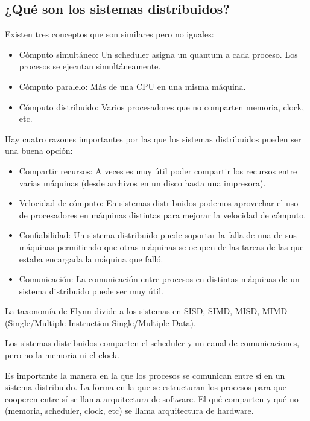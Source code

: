 \documentclass{article}
\begin{document}
\subsection{¿Qu\'e son los sistemas distribuidos?}

Existen tres conceptos que son similares pero no iguales:

\begin{itemize}
\item C\'omputo simult\'aneo: Un scheduler asigna un quantum a cada proceso. Los procesos se ejecutan simult\'aneamente.
\item C\'omputo paralelo: M\'as de una CPU en una misma m\'aquina.
\item C\'omputo distribuido: Varios procesadores que no comparten memoria, clock, etc.
\end{itemize}

Hay cuatro razones importantes por las que los sistemas distribuidos pueden ser una buena opci\'on:

\begin{itemize}
\item Compartir recursos: A veces es muy \'util poder compartir los recursos entre varias m\'aquinas (desde archivos en un disco hasta una impresora).
\item Velocidad de c\'omputo: En sistemas distribuidos podemos aprovechar el uso de procesadores en m\'aquinas distintas para mejorar la velocidad de c\'omputo.
\item Confiabilidad: Un sistema distribuido puede soportar la falla de una de sus m\'aquinas permitiendo que otras m\'aquinas se ocupen de las tareas de las que estaba encargada la m\'aquina que fall\'o.
\item Comunicaci\'on: La comunicaci\'on entre procesos en distintas m\'aquinas de un sistema distribuido puede ser muy \'util.
\end{itemize}

La taxonom\'ia de Flynn divide a los sistemas en SISD, SIMD, MISD, MIMD (Single/Multiple Instruction Single/Multiple Data).

Los sistemas distribuidos comparten el scheduler y un canal de comunicaciones, pero no la memoria ni el clock.

Es importante la manera en la que los procesos se comunican entre s\'i en un sistema distribuido. La forma en la que se estructuran los procesos para que cooperen entre s\'i se llama arquitectura de software. El qu\'e comparten y qu\'e no (memoria, scheduler, clock, etc) se llama arquitectura de hardware.
\end{document}
